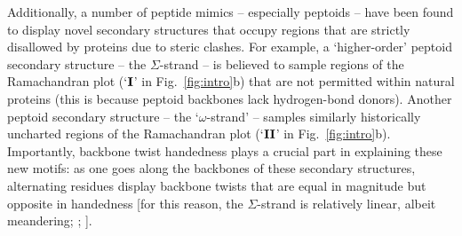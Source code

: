 \documentclass[fleqn,10pt,lineno]{wlpeerj} %
\newcommand{\n}[1]{{\color{black}#1}} %
\newcommand{\Fig}[1]{Fig.~\ref{#1}}
\begin{document}
Additionally, a number of peptide mimics -- especially peptoids \citep{Sun2013} -- \n{have been found to} display novel secondary structures that occupy regions that are strictly disallowed by proteins due to steric clashes. %
For example, a `higher-order' peptoid secondary structure -- the $\Sigma$-strand \citep{Mannige2015,Robertson2016} -- \n{is believed to sample} regions of the Ramachandran plot (`$\textrm{\textbf{I}}$' in \Fig{fig:intro}b) that are not permitted within natural proteins (\n{this is because peptoid backbones lack hydrogen-bond donors}). Another \n{peptoid} secondary structure -- the `$\omega$-strand' \citep{Gorske2016} -- samples similarly historically uncharted regions of the Ramachandran plot (`$\textrm{\textbf{II}}$' in \Fig{fig:intro}b). Importantly, backbone twist handedness plays a crucial part in explaining these new motifs: as one goes along the backbones of these secondary structures, alternating residues 
\n{display backbone twists that are equal in magnitude but opposite in handedness} [for this reason, the $\Sigma$-strand is relatively linear, albeit meandering; \cite{Mannige2015}; \cite{Mannige2016}].
\end{document}
